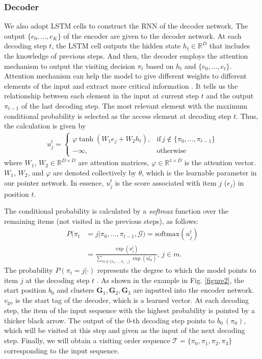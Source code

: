 \documentclass[journal]{IEEEtran}
\begin{document}
    \subsubsection{Decoder}
    We also adopt LSTM cells to construct the RNN of the decoder network. The output $\{e_0, \dots, e_K\}$ of the encoder are given to the decoder network. At each decoding step $t$, the LSTM cell outputs the hidden state $h_t\in\mathbb{R}^D$ that includes the knowledge of previous steps. And then, the decoder employs the attention mechanism to output the visiting decision $\pi_t$ based on $h_t$ and $\{e_0, \dots, e_t\}$. Attention mechanism can help the model to give different weights to different elements of the input and extract more critical information \cite{O. Vinyals A. Toshev}. It tells us the relationship between each element in the input at current step $t$ and the output $\pi_{t-1}$ of the last decoding step. The most relevant element with the maximum conditional probability is selected as the access element at decoding step $t$. Thus, the calculation is given by
    \begin{eqnarray}
            \label{mu}
            u^t_j = \left\{ \begin{array}{ll}
	        \varphi \tanh{\left(W_{1}e_j + W_2h_t\right)}, & \text{if}\, j \notin \{\pi_0,\dots,\pi_{t-1}\} \\
	        -\infty, & \text{otherwise}
	\end{array} \right.
    \end{eqnarray}
    where $W_1$, $W_2\in\mathbb{R}^{D\times D}$ are attention matrices, $\varphi\in\mathbb{R}^{1\times D} $ is the attention vector. $W_1$, $W_2$, and $\varphi$ are denoted collectively by $\theta$, which is the learnable parameter in our pointer network. In essence, $u^t_j$ is the score associated with item $j$ ($e_j$) in position $t$.

    The conditional probability is calculated by a \emph{softmax} function over the remaining items (not visited in the previous steps), as follows:
    \begin{align}
    \label{pro}
        P(\pi_{t}&=j|\pi_0,\dots,\pi_{t-1}, \bm{\mathcal{G}})  = \text{softmax}\left(u^t_j\right) \nonumber \\
        & = \frac{\exp{\left(u^t_j\right)}}{\sum_{m\notin \{\pi_0,\dots,\pi_{t-1}\}}\exp{\left(u^t_m\right)}},\, j\in m.
    \end{align}
    The probability $P\left(\pi_{t}=j|\cdot\right)$ represents the degree to which the model points to item $j$ at the decoding step $t$ \cite{I. Bello etc.}. As shown in the example in Fig. \ref{figure2}, the start position $b_0$ and clusters $\bm{G}_1, \bm{G}_2, \bm{G}_3$ are inputted into the encoder network. $v_{\text{go}}$ is the start tag of the decoder, which is a learned vector. At each decoding step, the item of the input sequence with the highest probability is pointed by a thicker black arrow. The output of the 0-th decoding step points to $b_{0}\, (\pi_0)$, which will be visited at this step and given as the input of the next decoding step. Finally, we will obtain a visiting order sequence $\bm{\mathcal{T}} = \{\pi_0,\pi_1,\pi_2,\pi_3\}$ corresponding to the input sequence. 
    
\end{document}
